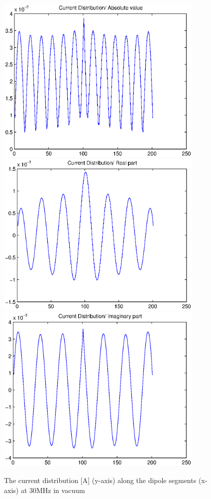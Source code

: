 \documentclass[a4paper,11pt]{thesis}
\begin{document}
\begin{figure}
 \begin{center}
\includegraphics[width=10.0cm]{DissPics/curr_abs_30mh.eps}
 \includegraphics[width=10.0cm]{DissPics/curr_re_30mh.eps}
 \includegraphics[width=10.0cm]{DissPics/curr_im_30mh.eps}\end{center}
  \caption{The current distribution [A] (y-axis) along the dipole segments (x-axis) at 30MHz in vacuum}\label{fig:curr_30mh_vac}
\end{figure}
\end{document}

